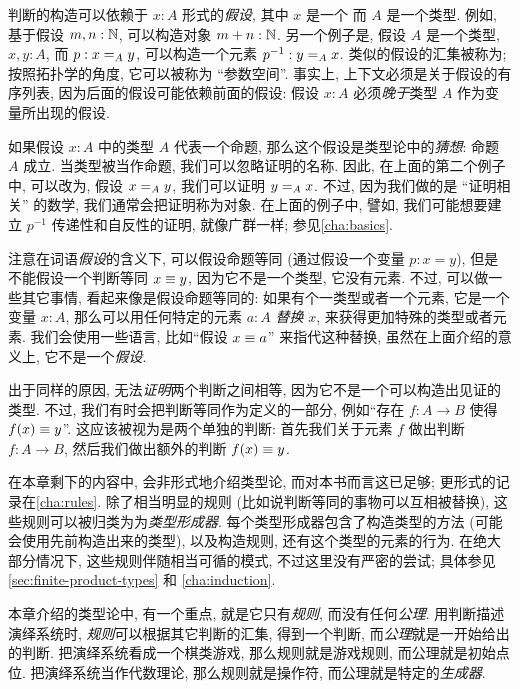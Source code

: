 %
判断的构造可以依赖于 $x:A$ 形式的\emph{假设}, 其中 $x$ 是一个 %
而 $A$ 是一个类型. 例如, 基于假设 $m,n : \nat$, 可以构造对象 $m + n : \nat$. 另一个例子是, 假设 $A$ 是一个类型, $x,y : A$, 而  $p : \id[A]{x}{y}$, 可以构造一个元素 $p^{-1} : \id[A]{y}{x}$. 类似的假设的汇集被称为;
按照拓扑学的角度, 它可以被称为 ``参数空间''. 事实上, 上下文必须是关于假设的有序列表, 因为后面的假设可能依赖前面的假设: 假设 $x:A$ 必须\emph{晚于}类型 $A$ 作为变量所出现的假设.

如果假设 $x:A$ 中的类型 $A$ 代表一个命题, 那么这个假设是类型论中的\emph{猜想}: %
命题 $A$ 成立. 当类型被当作命题, 我们可以忽略证明的名称. 因此, 在上面的第二个例子中, 可以改为, 假设 $\id[A]{x}{y}$, 我们可以证明 $\id[A]{y}{x}$. 不过, 因为我们做的是 ``证明相关'' 的数学, %
我们通常会把证明称为对象. 在上面的例子中, 譬如, 我们可能想要建立 $p^{-1}$ 传递性和自反性的证明, 就像广群一样; 参见\cref{cha:basics}.

注意在词语\emph{假设}的含义下, 可以假设命题等同 (通过假设一个变量 $p:x=y$), 但是不能假设一个判断等同 $x\jdeq y$, 因为它不是一个类型, 它没有元素. 不过, 可以做一些其它事情, 看起来像是假设命题等同的: 如果有个一类型或者一个元素, 它是一个变量 $x:A$, 那么可以用任何特定的元素 $a:A$ \emph{替换} $x$, 来获得更加特殊的类型或者元素. 我们会使用一些语言, 比如``假设 $x\jdeq a$'' 来指代这种替换, 虽然在上面介绍的意义上, 它不是一个\emph{假设}.%

出于同样的原因, 无法\emph{证明}两个判断之间相等, 因为它不是一个可以构造出见证的类型. 不过, 我们有时会把判断等同作为定义的一部分, 例如``存在 $f:A\to B$ 使得 $f(x)\jdeq y$''. 这应该被视为是两个单独的判断: 首先我们关于元素 $f$ 做出判断  $f:A\to B$, 然后我们做出额外的判断 $f(x)\jdeq y$.

在本章剩下的内容中, 会非形式地介绍类型论, 而对本书而言这已足够; 更形式的记录在\cref{cha:rules}. 除了相当明显的规则 (比如说判断等同的事物可以互相被替换), 这些规则可以被归类为为\emph{类型形成器}. 每个类型形成器包含了构造类型的方法 (可能会使用先前构造出来的类型), 以及构造规则, 还有这个类型的元素的行为. 在绝大部分情况下, 这些规则伴随相当可循的模式, 不过这里没有严密的尝试; 具体参见 \cref{sec:finite-product-types} 和 \cref{cha:induction}.


%
%
本章介绍的类型论中, 有一个重点, 就是它只有\emph{规则}, 而没有任何\emph{公理}. 用判断描述演绎系统时, \emph{规则}可以根据其它判断的汇集, 得到一个判断, 而\emph{公理}就是一开始给出的判断. 把演绎系统看成一个棋类游戏, 那么规则就是游戏规则, 而公理就是初始点位. 把演绎系统当作代数理论, 那么规则就是操作符, 而公理就是特定的\emph{生成器}.

